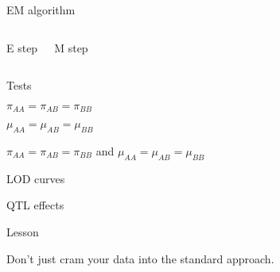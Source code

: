 \documentclass[aspectratio=169,12pt,t]{beamer}
\begin{document}
\begin{frame}{EM algorithm}

  \begin{columns}


    {\hilit E step}

    \bigskip




    {\hilit M step}

    \bigskip



  \end{columns}


\note{
}

\end{frame}



\begin{frame}{Tests}

  \bbi
\item $\pi_{AA} = \pi_{AB} = \pi_{BB}$
\item $\mu_{AA} = \mu_{AB} = \mu_{BB}$
\item $\pi_{AA} = \pi_{AB} = \pi_{BB}$ and $\mu_{AA} = \mu_{AB} = \mu_{BB}$
  \ei



\note{
}

\end{frame}


\begin{frame}[c]{LOD curves}

\note{
}

\end{frame}


\begin{frame}[c]{QTL effects}

\note{
}

\end{frame}




\begin{frame}{Lesson}

\bbi
\item Don't just cram your data into the standard approach.


\ei


\note{
}

\end{frame}
\end{document}
